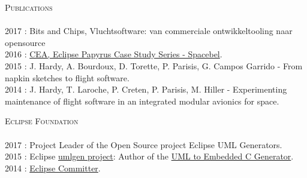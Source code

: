 \documentclass{article}
\newcommand{\lineunder}{\vspace*{-8pt} \\ \hspace*{-18pt} \hrulefill \\}
\newcommand{\header}[1]{{\hspace*{-15pt}\vspace*{6pt} \textsc{#1}} \vspace*{-6pt} \lineunder}
\begin{document}
\header{Publications}
2017 : Bits and Chips, Vluchtsoftware: van commerciale ontwikkeltooling naar opensource \\
2016 : \href{https://eclipse.org/papyrus/resources/spacebel-usecasestory.pdf}{CEA, Eclipse Papyrus Case Study Series - Spacebel}. \\
2015 : J. Hardy, A. Bourdoux, D. Torette, P. Parisis, G. Campos Garrido - From napkin sketches to flight software. \\
2014 : J. Hardy, T. Laroche, P. Creten, P. Parisis, M. Hiller - Experimenting maintenance of flight software in an
\hspace*{0.95cm} integrated modular avionics for space. \\
\vspace{0.3cm} 

\header{Eclipse Foundation}
2017 : Project Leader of the Open Source project Eclipse UML Generators. \\
2015 : Eclipse \href{https://projects.eclipse.org/projects/modeling.umlgen}{umlgen project}:
Author of the \href{http://wiki.eclipse.org/Category:Eclipse_UML_Generators/Specification/EmbeddedCGenerator/Contribution}{UML to Embedded C Generator}.\\
2014 : \href{https://projects.eclipse.org/user/3596}{Eclipse Committer}.\\
\end{document}
